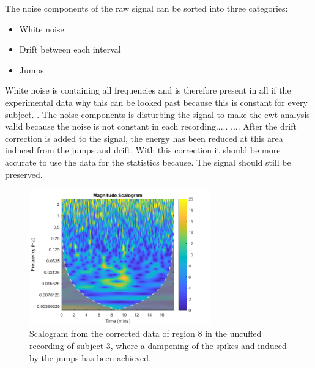 The noise components of the raw signal can be sorted into three categories: 
\begin{itemize}
	\item White noise
    \item Drift between each interval
	\item Jumps
\end{itemize}

White noise is containing all frequencies and is therefore present in all if the experimental data why this can be looked past because this is constant for every subject. . The noise components is disturbing the signal to make the cwt analysis valid because the noise is not constant in each recording.....
....
After the drift correction is added to the signal, the energy  has been reduced at this area induced from the jumps and drift. With this correction it should be more accurate to use the data for the statistics because. The signal should still be  preserved. 

\begin{figure}[H]
	\includegraphics[width=0.7\textwidth]{figures/uncuffed_sub3_roi8_corr}
	\caption{Scalogram from the corrected data of region 8 in the uncuffed recording of subject 3, where a dampening of the spikes and  induced by the jumps has been achieved.}
	\label{fig:scalogram_corr}
\end{figure} 